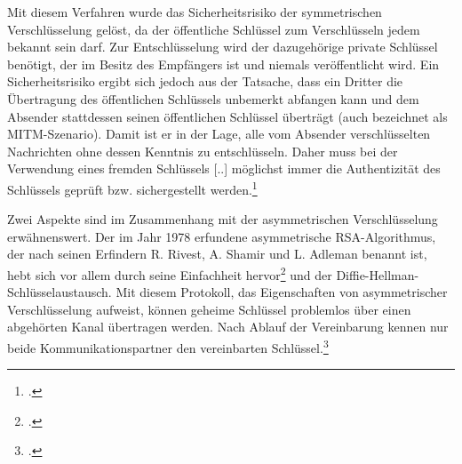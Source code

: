 \documentclass  [paper=a4,
				fontsize=12pt,
				listof=totoc,
				bibliography=totoc
				]{scrreprt}
\begin{document}
				Mit diesem Verfahren wurde das Sicherheitsrisiko der symmetrischen Verschlüsselung gelöst, da der öffentliche Schlüssel zum Verschlüsseln jedem bekannt sein darf. Zur Entschlüsselung wird der dazugehörige private Schlüssel benötigt, der im Besitz des Empfängers ist und niemals veröffentlicht wird.
				Ein Sicherheitsrisiko ergibt sich jedoch aus der Tatsache, dass ein Dritter die Übertragung des öffentlichen Schlüssels unbemerkt abfangen kann und dem Absender stattdessen seinen öffentlichen Schlüssel überträgt (auch bezeichnet als \ac{MITM}-Szenario). Damit ist er in der Lage, alle vom Absender verschlüsselten Nachrichten ohne dessen Kenntnis zu entschlüsseln. Daher muss \glqq bei der Verwendung eines fremden Schlüssels [..] möglichst immer die Authentizität des Schlüssels geprüft bzw. sichergestellt werden.\grqq\footcite[][S. 90]{Ertel2012}
				
				Zwei Aspekte sind im Zusammenhang mit der asymmetrischen Verschlüsselung erwähnenswert. Der im Jahr 1978 erfundene asymmetrische \ac{RSA}-Algorithmus, der nach seinen Erfindern R. Rivest, A. Shamir und L. Adleman benannt ist, hebt sich vor allem durch seine Einfachheit hervor\footcite[Vgl.][S. 79]{Ertel2012} \color{darkred}und der Diffie-Hellman-Schlüsselaustausch\color{black}. Mit diesem Protokoll, das Eigenschaften von asymmetrischer Verschlüsselung aufweist, können geheime Schlüssel problemlos über einen abgehörten Kanal übertragen werden. Nach Ablauf der Vereinbarung kennen nur beide Kommunikationspartner den vereinbarten Schlüssel.\footcite[Vgl.][S. 129]{Stephan2011}
\end{document}

